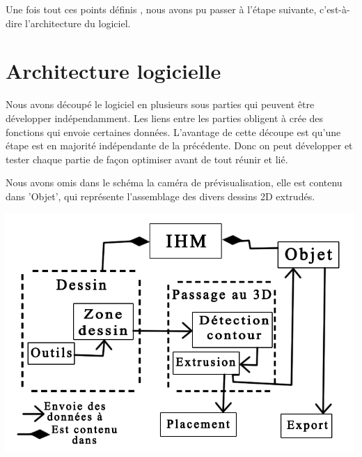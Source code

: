 \documentclass[a4paper,11pt]{article}
\begin{document}
		Une fois tout ces points définis , nous avons pu passer à l'étape suivante, c'est-à-dire l'architecture du logiciel.
		
	\section{Architecture logicielle}
		Nous avons découpé le logiciel en plusieurs sous parties qui peuvent être développer indépendamment. Les liens entre les parties obligent à crée des fonctions qui envoie certaines données. L'avantage de cette découpe est qu'une étape est en majorité indépendante de la précédente. Donc on peut développer et tester chaque partie de façon optimiser avant de tout réunir et lié.
		
		Nous avons omis dans le schéma la caméra de prévisualisation, elle est contenu dans
		'Objet', qui représente l'assemblage des divers dessins 2D extrudés.

				\centerline{\includegraphics[scale=0.5]{images/archi.png}}
	
		
\end{document}
